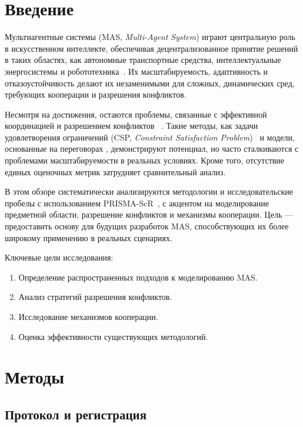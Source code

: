 \documentclass[%
]{ittmm}
\begin{document}
\section{Введение}
\label{sec:intro}

Мультиагентные системы (MAS, \textit{Multi-Agent System}) играют центральную роль в искусственном интеллекте,
обеспечивая децентрализованное принятие решений в таких областях, как автономные
транспортные средства, интеллектуальные энергосистемы и робототехника~\cite{Torre_o_2017}.
Их масштабируемость, адаптивность и отказоустойчивость делают их незаменимыми
для сложных, динамических сред, требующих кооперации и разрешения конфликтов.

Несмотря на достижения, остаются проблемы, связанные с эффективной координацией
и разрешением конфликтов~\cite{galesloot2024factoredonlineplanningmanyagent}
\cite{zhang2014formalanalysisrequiredcooperation}. Такие методы, как задачи удовлетворения
ограничений (CSP, \textit{Constraint Satisfaction Problem})~\cite{KOMENDA201476} и модели, основанные на переговорах
\cite{GROSZ1996269,RABELO1994303}, демонстрируют потенциал, но часто сталкиваются
с проблемами масштабируемости в реальных условиях. Кроме того, отсутствие единых
оценочных метрик затрудняет сравнительный анализ.

В этом обзоре систематически анализируются методологии и исследовательские пробелы
с использованием PRISMA-ScR~\cite{prisma-src}, с акцентом на моделирование предметной
области, разрешение конфликтов и механизмы кооперации. Цель — предоставить основу
для будущих разработок MAS, способствующих их более широкому применению в реальных
сценариях.

Ключевые цели исследования:

\begin{enumerate}
  \item Определение распространенных подходов к моделированию MAS.
  \item Анализ стратегий разрешения конфликтов.
  \item Исследование механизмов кооперации.
  \item Оценка эффективности существующих методологий.
\end{enumerate}

\section{Методы} 
\label{sec:methods}

\subsection{Протокол и регистрация}
\end{document}
